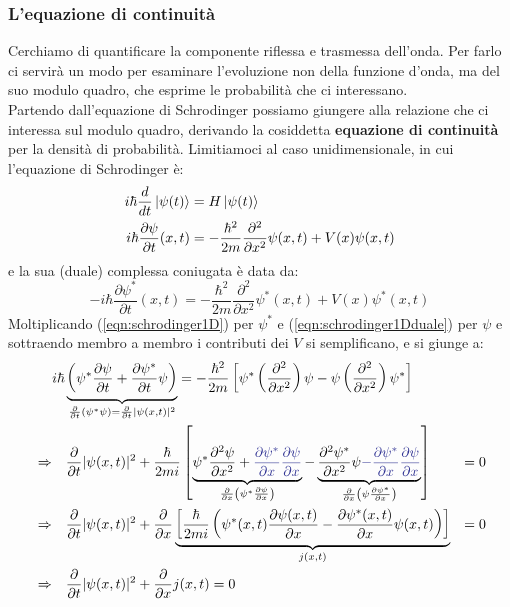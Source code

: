 \documentclass[../../FisicaTeorica.tex]{subfiles}
\begin{document}
\subsubsection{L'equazione di continuità}
Cerchiamo di quantificare la componente riflessa e trasmessa dell'onda. Per farlo ci servirà un modo per esaminare l'evoluzione non della funzione d'onda, ma del suo modulo quadro, che esprime le probabilità che ci interessano.\\
Partendo dall'equazione di Schrodinger possiamo giungere alla relazione che ci interessa sul modulo quadro, derivando la cosiddetta \textbf{equazione di continuità} per la densità di probabilità. Limitiamoci al caso unidimensionale, in cui l'equazione di Schrodinger è: 
\begin{align}
i\hbar \frac{d}{dt} \Ket{\psi(t)} &= H\Ket{\psi(t)}\\
i\hbar \frac{\partial \psi}{\partial t}(x,t)&=-\frac{\hbar^2}{2m}\frac{\partial^2}{\partial x^2}\psi(x,t)+V(x)\psi(x,t)
\label{eqn:schrodinger1D}
\end{align}
e la sua (duale) complessa coniugata è data da:
\begin{equation}
-i\hbar \frac{\partial \psi^*}{\partial t}(x,t)=-\frac{\hbar^2}{2m}\frac{\partial^2}{\partial x^2}\psi^*(x,t)+V(x)\psi^*(x,t)
\label{eqn:schrodinger1Dduale}
\end{equation}
Moltiplicando (\ref{eqn:schrodinger1D}) per $\psi^*$ e (\ref{eqn:schrodinger1Dduale}) per $\psi$ e sottraendo membro a membro i contributi dei $V$ si semplificano, e si giunge a:
\begin{align}
\nonumber
\span
i\hbar\underbrace{\left(
\psi^*\frac{\partial \psi}{\partial t}+\frac{\partial \psi^*}{\partial t}\psi
\right)}_{\frac{\partial}{\partial t}(\psi^*\psi)=\frac{\partial }{\partial t}|\psi(x,t)|^2} =-\frac{\hbar^2}{2m}\left [
\psi^*\left(\frac{\partial^2}{\partial x^2}\right) \psi-\psi\left(\frac{\partial^2}{\partial x^2}\right) \psi^*
\right ]\span\span\span\\
\nonumber
&\Rightarrow &&
\frac{\partial}{\partial t}|\psi(x,t)|^2 + \frac{\hbar}{2mi}\left [
\underbrace{\psi^*\frac{\partial^2 \psi}{\partial x^2}
+\textcolor{Blue}{\frac{\partial \psi^*}{\partial x}\frac{\partial \psi}{\partial x}}
}_{\frac{\partial}{\partial x}\left (\psi^* \frac{\partial \psi}{\partial x} \right)}-\underbrace{\frac{\partial^2 \psi^*}{\partial x^2}\psi
 \textcolor{Blue}{-\frac{\partial \psi^*}{\partial x}\frac{\partial \psi}{\partial x}}
 }_{\frac{\partial}{\partial x}\left(\psi\frac{\partial \psi^*}{\partial x}\right)}\right ] &=0\\
\nonumber
&\Rightarrow && \frac{\partial}{\partial t}|\psi(x,t)|^2 +
\frac{\partial}{\partial x}
\underbrace{\left[\frac{\hbar}{2mi}
\left(
\psi^*(x,t)\frac{\partial \psi(x,t)}{\partial x} - \frac{\partial \psi^*(x,t)}{\partial x} \psi(x,t)
 \right) \right]}_{j(x,t)}
 &= 0\\
&\Rightarrow  && \frac{\partial}{\partial t}|\psi(x,t)|^2 +\frac{\partial}{\partial x}j(x,t) = 0 \span
\label{eqn:probability_continuity}
\end{align}
\end{document}
